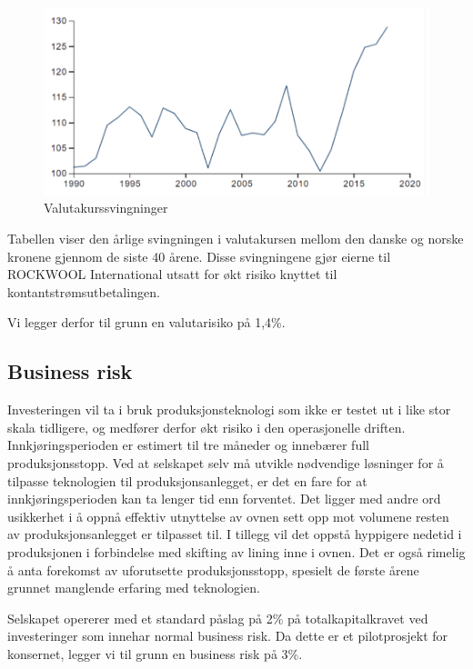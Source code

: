 \begin{figure}[H]
  \includegraphics[width=\linewidth]{bilder/valutahistorikk.png}
  \caption{Valutakurssvingninger}
  \label{fig:valutahistorikk}
\end{figure}

Tabellen viser den årlige svingningen i valutakursen mellom den danske og norske kronene gjennom de siste 40 årene. Disse svingningene gjør eierne til ROCKWOOL International utsatt for økt risiko knyttet til kontantstrømsutbetalingen.  

\indent \newline
Vi legger derfor til grunn en valutarisiko på 1,4\%.

\subsection{Business risk}
Investeringen vil ta i bruk produksjonsteknologi som ikke er testet ut i like stor skala tidligere, og medfører derfor økt risiko i den operasjonelle driften. Innkjøringsperioden er estimert til tre måneder og innebærer full produksjonsstopp. Ved at selskapet selv må utvikle nødvendige løsninger for å tilpasse teknologien til produksjonsanlegget, er det en fare for at innkjøringsperioden kan ta lenger tid enn forventet. Det ligger med andre ord usikkerhet i å oppnå effektiv utnyttelse av ovnen sett opp mot volumene resten av produksjonsanlegget er tilpasset til. I tillegg vil det oppstå hyppigere nedetid i produksjonen i forbindelse med skifting av lining inne i ovnen. Det er også rimelig å anta forekomst av uforutsette produksjonsstopp, spesielt de første årene grunnet manglende erfaring med teknologien.

\indent \newline
Selskapet opererer med et standard påslag på 2\% på totalkapitalkravet ved investeringer som innehar normal business risk. Da dette er et pilotprosjekt for konsernet, legger vi til grunn en business risk på 3\%.

